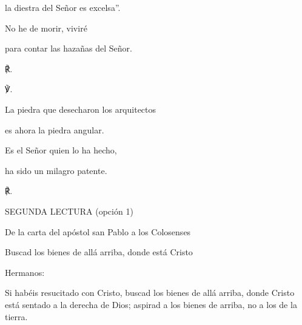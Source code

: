 			\begin{readtabbed}la diestra del Señor es excelsa”. \end{readtabbed}
			
			\begin{readtabbed}No he de morir, viviré \end{readtabbed}
			
			\begin{readtabbed}para contar las hazañas del Señor. \begin{readred}℟.\end{readred}\end{readtabbed}
			
			\begin{readbody}\begin{readred}℣.\end{readred} La piedra que desecharon los arquitectos \end{readbody}
			
			\begin{readtabbed}es ahora la piedra angular. \end{readtabbed}
			
			\begin{readtabbed}Es el Señor quien lo ha hecho, \end{readtabbed}
			
			\begin{readtabbed}ha sido un milagro patente. \begin{readred}℟.\end{readred}\end{readtabbed}
			
			\begin{readtitle}SEGUNDA LECTURA (opción 1)\end{readtitle}
			
			\begin{readbook}De la carta del apóstol san Pablo a los Colosenses \end{readbook}
			
			\begin{readtheme}Buscad los bienes de allá arriba, donde está Cristo\end{readtheme}
			
			\begin{readbody}Hermanos: \end{readbody}
			
			\begin{readbody}Si habéis resucitado con Cristo, buscad los bienes de allá arriba, donde Cristo está sentado a la derecha de Dios; aspirad a los bienes de arriba, no a los de la tierra. \end{readbody}
			
